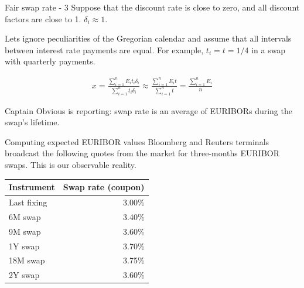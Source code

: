 \documentclass{beamer}
\begin{document}
\begin{frame}{Fair swap rate - 3}
\justify
Suppose that the discount rate is close to zero, and all discount factors are close to 1. $\delta_i \approx1$.

\justify
Lets ignore peculiarities of the Gregorian calendar and assume that all intervals between interest rate payments are equal. For example, $t_i = t = 1/4$ in a swap with quarterly payments.

\begin{align*}
x = \frac{\sum\limits_{i=1}^{n} E_i t_i \delta_i}{\sum\limits_{i=1}^{n} t_i \delta_i}
\approx
\frac{\sum\limits_{i=1}^{n} E_i t}{\sum\limits_{i=1}^{n} t}
=
\frac{\sum\limits_{i=1}^{n} E_i}{n}
\end{align*}

\justify
Captain Obvious is reporting: swap rate is an average of EURIBORs during the swap's lifetime.
\end{frame}



\begin{frame}{Computing expected EURIBOR values}
\justify
Bloomberg and Reuters terminals broadcast the following quotes from the market for three-months EURIBOR swaps. This is our observable reality.

\justify
\centering
\begin{tabular}{l|r}
Instrument        & Swap rate (coupon) \\ \hline
Last fixing & 3.00\% \\
6M swap           & 3.40\% \\
9M swap           & 3.60\% \\
1Y swap           & 3.70\% \\
18M swap          & 3.75\% \\
2Y swap           & 3.60\%
\end{tabular}

\end{frame}
\end{document}
